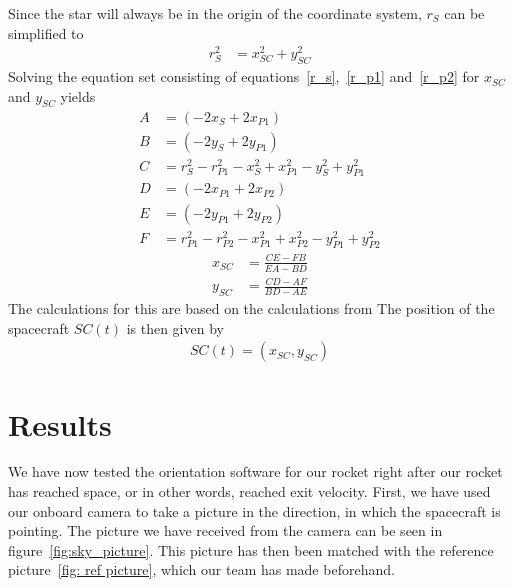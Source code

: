 \documentclass[reprint,english,notitlepage]{revtex4-2}
\begin{document}
Since the star will always be in the origin of the coordinate system, $r_S$ can be simplified to
\begin{align*}
    r_S^2 &= x_{SC}^2 + y_{SC}^2
\end{align*}
Solving the equation set consisting of equations~\eqref{r_s},~\eqref{r_p1} and~\eqref{r_p2} for $x_{SC}$ and $y_{SC}$ yields
\begin{align*}
    A& = \left(-2x_S + 2x_{P1}\right)\\
	B& = \left(-2y_S + 2y_{P1}\right)\\
	C& = r_S^2 - r_{P1}^2 - x_S^2 + x_{P1}^2 - y_S^2 + y_{P1}^2\\
	D& = \left(-2x_{P1} + 2x_{P2}\right)\\
	E& = \left(-2y_{P1} + 2y_{P2}\right)\\
	F& = r_{P1}^2 - r_{P2}^2 - x_{P1}^2 + x_{P2}^2 - y_{P1}^2 + y_{P2}^2
\end{align*}
\begin{align*}
    x_{SC}& = \frac{CE - FB}{EA - BD}\\
	y_{SC}& = \frac{CD - AF}{BD - AE}
\end{align*}
The calculations for this are based on the calculations from%
The position of the spacecraft $SC(t)$ is then given by
\begin{align*}
    SC(t) = \left(x_{SC}, y_{SC} \right)
\end{align*}



\section{Results} \label{sec:results}
We have now tested the orientation software for our rocket right after our rocket has reached space, or in other words, reached exit velocity.
First, we have used our onboard camera to take a picture in the direction, in which the spacecraft is pointing.
The picture we have received from the camera can be seen in figure~\ref{fig:sky_picture}.
This picture has then been matched with the reference picture~\ref{fig: ref picture}, which our team has made beforehand.
\end{document}
